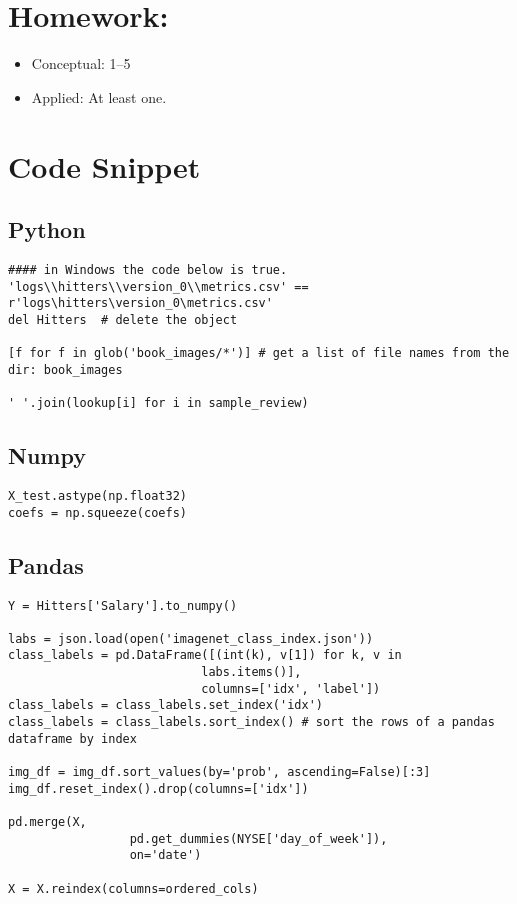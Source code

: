 \documentclass[
  letterpaper,
  DIV=11,
  numbers=noendperiod]{scrreprt}
\providecommand{\tightlist}{%
  \setlength{\itemsep}{0pt}\setlength{\parskip}{0pt}}\usepackage{longtable,booktabs,array}
\begin{document}
\section{Homework:}\label{homework-6}

\begin{itemize}
\tightlist
\item
  Conceptual: 1--5
\item
  Applied: At least one.
\end{itemize}

\section{Code Snippet}\label{code-snippet-4}

\subsection{Python}\label{python-8}

\begin{verbatim}
#### in Windows the code below is true. 
'logs\\hitters\\version_0\\metrics.csv' == r'logs\hitters\version_0\metrics.csv'
del Hitters  # delete the object

[f for f in glob('book_images/*')] # get a list of file names from the dir: book_images

' '.join(lookup[i] for i in sample_review)
\end{verbatim}

\subsection{Numpy}\label{numpy-8}

\begin{verbatim}
X_test.astype(np.float32)
coefs = np.squeeze(coefs)
\end{verbatim}

\subsection{Pandas}\label{pandas-8}

\begin{verbatim}
Y = Hitters['Salary'].to_numpy()

labs = json.load(open('imagenet_class_index.json'))
class_labels = pd.DataFrame([(int(k), v[1]) for k, v in 
                           labs.items()],
                           columns=['idx', 'label'])
class_labels = class_labels.set_index('idx')
class_labels = class_labels.sort_index() # sort the rows of a pandas dataframe by index

img_df = img_df.sort_values(by='prob', ascending=False)[:3]
img_df.reset_index().drop(columns=['idx'])

pd.merge(X, 
                 pd.get_dummies(NYSE['day_of_week']),
                 on='date')
                 
X = X.reindex(columns=ordered_cols)                 
\end{verbatim}
\end{document}
